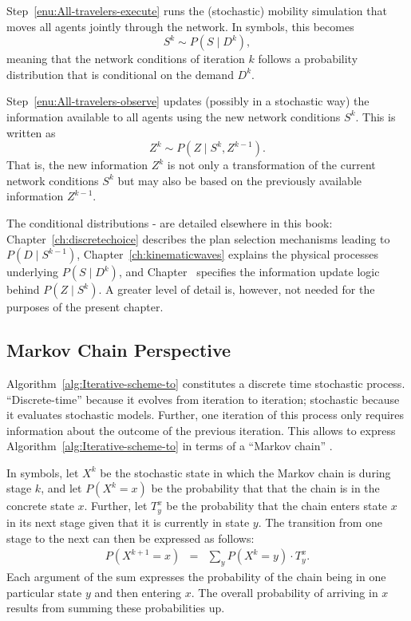 Step~\ref{enu:All-travelers-execute} runs the (stochastic) mobility
simulation that moves all agents jointly through the network. In symbols,
this becomes
\begin{equation}
S^{k}\sim P(S\mid D^{k}),\label{eq:network-loading-model}
\end{equation}
meaning that the network conditions of iteration $k$ follows a probability
distribution that is conditional on the demand $D^{k}$. 

Step~\ref{enu:All-travelers-observe} updates (possibly in a stochastic
way) the information available to all agents using the new network
conditions $S^{k}$. This is written as
\begin{equation}
Z^{k}\sim P(Z\mid S^{k},Z^{k-1}).\label{eq:learning-model}
\end{equation}
That is, the new information $Z^{k}$ is not only a transformation
of the current network conditions $S^{k}$ but may also be based on
the previously available information $Z^{k-1}$.

The conditional distributions -
are detailed elsewhere in this book: Chapter~\ref{ch:discretechoice} 
describes the plan selection mechanisms leading to $P(D\mid S^{k-1})$,
Chapter~\ref{ch:kinematicwaves} explains the physical processes underlying
$P(S\mid D^{k})$, and Chapter~  specifies the information
update logic behind $P(Z\mid S^{k})$. A greater level of detail is,
however, not needed for the purposes of the present chapter.


\subsection{\label{sub:Markov-chain-perspective}Markov Chain Perspective}

Algorithm~\ref{alg:Iterative-scheme-to} constitutes a discrete time
stochastic process. {}``Discrete-time'' because it evolves from
iteration to iteration; stochastic because it evaluates stochastic
models. Further, one iteration of this process only requires information
about the outcome of the previous iteration. This allows to express
Algorithm~\ref{alg:Iterative-scheme-to} in terms of a {}``Markov
chain'' \citep{ross-2006}.

In symbols, let $X^{k}$ be the stochastic state in which the Markov
chain is during stage $k$, and let $P(X^{k}=x)$ be the probability
that that the chain is in the concrete state $x$. Further, let $T_{y}^{x}$
be the probability that the chain enters state $x$ in its next stage
given that it is currently in state $y$. The transition from one
stage to the next can then be expressed as follows:
\begin{eqnarray}
P(X^{k+1}=x) & = & \sum_{y}P(X^{k}=y)\cdot T_{y}^{x}.\label{eq:one-mc-transition}
\end{eqnarray}
Each argument of the sum expresses the probability of the chain being
in one particular state $y$ and then entering $x$. The overall probability
of arriving in $x$ results from summing these probabilities up.


